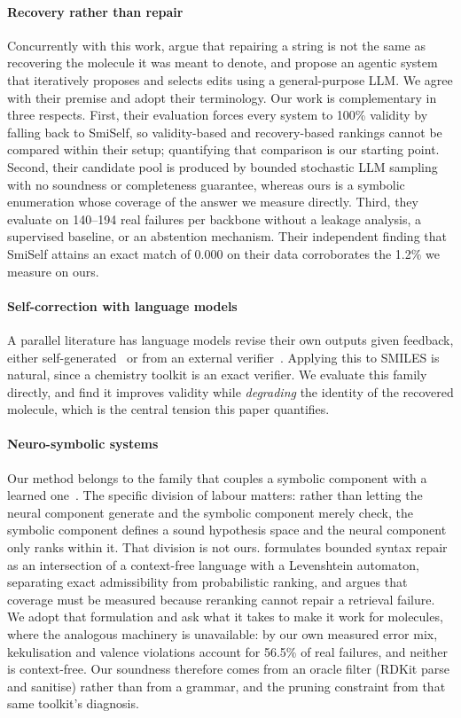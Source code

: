 \documentclass[conference]{IEEEtran}
\begin{document}
\paragraph{Recovery rather than repair}
Concurrently with this work, \citet{amrec} argue that repairing a string is not
the same as recovering the molecule it was meant to denote, and propose an
agentic system that iteratively proposes and selects edits using a
general-purpose LLM. We agree with their premise and adopt their
terminology. Our work is complementary in three respects. First, their
evaluation forces every system to 100\% validity by falling back to SmiSelf, so
validity-based and recovery-based rankings cannot be compared within their
setup; quantifying that comparison is our starting point. Second, their
candidate pool is produced by bounded stochastic LLM sampling with no soundness
or completeness guarantee, whereas ours is a symbolic enumeration whose coverage
of the answer we measure directly. Third, they evaluate on 140--194 real
failures per backbone without a leakage analysis, a supervised baseline, or an
abstention mechanism. Their independent finding that SmiSelf attains an exact
match of 0.000 on their data corroborates the 1.2\% we measure on ours.

\paragraph{Self-correction with language models}
A parallel literature has language models revise their own outputs given
feedback, either self-generated~\citep{madaan2023selfrefine} or from an external
verifier~\citep{gou2024critic,welleck2023generating}. Applying this to SMILES is
natural, since a chemistry toolkit is an exact verifier. We evaluate this family
directly, and find it improves validity while \emph{degrading} the identity of
the recovered molecule, which is the central tension this paper quantifies.

\paragraph{Neuro-symbolic systems}
Our method belongs to the family that couples a symbolic component with a
learned one~\citep{garcez2023neurosymbolic}. The specific division of labour
matters: rather than letting the neural component generate and the symbolic
component merely check, the symbolic component defines a sound hypothesis space
and the neural component only ranks within it. That division is not ours.
\citet{considine2025syntax} formulates bounded syntax repair as an intersection
of a context-free language with a Levenshtein automaton, separating exact
admissibility from probabilistic ranking, and argues that coverage must be
measured because reranking cannot repair a retrieval failure. We adopt that
formulation and ask what it takes to make it work for molecules, where the
analogous machinery is unavailable: by our own measured error mix, kekulisation
and valence violations account for 56.5\% of real failures, and neither is
context-free. Our soundness therefore comes from an oracle filter (RDKit parse and sanitise)
rather than from a grammar, and the pruning constraint from that same toolkit's
diagnosis.
\end{document}
